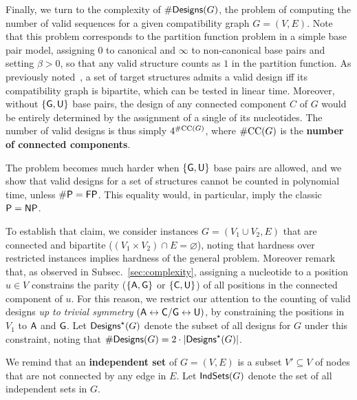 \documentclass{bioinfo}
\newcommand{\real}{\mathbb{R}}
\newcommand{\Def}[1]{{\bfseries #1}}
\newcommand{\Design}[1]{{\sf Designs}^{\star}(#1)}
\newcommand{\NumDesign}{\ensuremath{\#}{\sf Designs}\xspace}
\newcommand{\IS}[1]{{\sf IndSets}(#1)}
\newcommand{\Nuc}[1]{{\sf #1}}
\newcommand{\Ab}{\Nuc{A}}
\newcommand{\Cb}{\Nuc{C}}
\newcommand{\Gb}{\Nuc{G}}
\newcommand{\Ub}{\Nuc{U}}
\begin{document}
Finally, we turn to the complexity of $\NumDesign(G)$, the problem of
computing the number of valid sequences for a given compatibility
graph $G=(V,E)$. Note that this problem corresponds to the partition
function problem in a simple base pair model, assigning $0$ to
canonical and $\infty$ to non-canonical base pairs and setting 
$\beta>0$, so that any valid structure counts as $1$ in the partition 
function. As previously noted~\citep{Flamm2001}, a set of target
structures admits a valid design iff its compatibility graph is
bipartite, which can be tested in linear time.  Moreover, without
$\{\Gb, \Ub\}$ base pairs, the design of any connected component $C$
of $G$ would be entirely determined by the assignment of a single of
its nucleotides. The number of valid designs is thus simply
$4^{\#{\rm CC}(G)}$, where $\#{\rm CC}(G)$ is the \Def{number of
  connected components}.

The problem becomes much harder when $\{\Gb, \Ub\}$ base pairs are allowed, and we show that valid designs for a set of structures cannot be counted in polynomial time, unless ${\sf\# P}={\sf FP}$. This equality would, in particular, imply the classic ${\sf P}={\sf NP}$.

To establish that claim, we consider instances $G=(V_1\cup V_2, E)$ that are connected and bipartite ($(V_1\times V_2) \cap E = \varnothing$), noting that hardness over restricted instances implies hardness of the general problem. Moreover remark that, as observed in Subsec.~\ref{sec:complexity}, assigning a nucleotide to a position $u\in V$ constrains the parity ($\{\Ab,\Gb\}$ or $\{\Cb,\Ub\}$) of all positions in the connected component of $u$. For this reason, we restrict our attention to the counting of valid designs \emph{up to trivial  symmetry} $(\Ab\leftrightarrow \Cb/\Gb\leftrightarrow \Ub)$, by constraining the positions in $V_{1}$ to $\Ab$ and $\Gb$. Let $\Design{G}$ denote the subset of all designs for $G$ under this constraint, noting that $\NumDesign(G) = 2\cdot|\Design{G}|$. 


We remind that an \Def{independent set} of $G=(V,E)$ is a subset $V'\subseteq V$ of nodes that are not connected by any edge in $E$. Let $\IS{G}$ denote the set of all independent sets in $G$.
\end{document}
